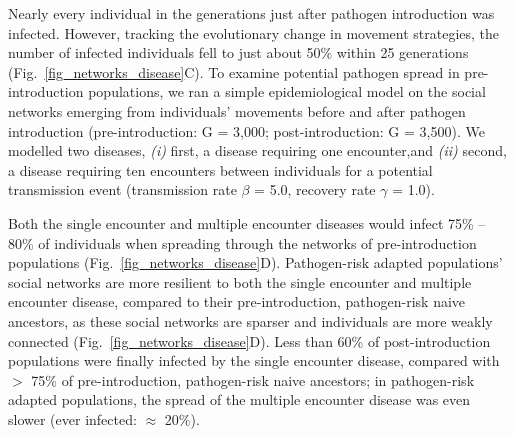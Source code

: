 Nearly every individual in the generations just after pathogen introduction was infected.
However, tracking the evolutionary change in movement strategies, the number of infected individuals fell to just about 50\% within 25 generations (Fig.~\ref{fig_networks_disease}C).
To examine potential pathogen spread in pre-introduction populations, we ran a simple epidemiological model on the social networks emerging from individuals' movements before and after pathogen introduction (pre-introduction: G = 3,000; post-introduction: G = 3,500).
We modelled two diseases, \textit{(i)} first, a disease requiring one encounter,and \textit{(ii)} second, a disease requiring ten encounters between individuals for a potential transmission event (transmission rate $\beta$ = 5.0, recovery rate $\gamma$ = 1.0).

Both the single encounter and multiple encounter diseases would infect 75\% -- 80\% of individuals when spreading through the networks of pre-introduction populations (Fig.~\ref{fig_networks_disease}D).
Pathogen-risk adapted populations' social networks are more resilient to both the single encounter and multiple encounter disease, compared to their pre-introduction, pathogen-risk naive ancestors, as these social networks are sparser and individuals are more weakly connected (Fig.~\ref{fig_networks_disease}D).
Less than 60\% of post-introduction populations were finally infected by the single encounter disease, compared with $>$ 75\% of pre-introduction, pathogen-risk naive ancestors; in pathogen-risk adapted populations, the spread of the multiple encounter disease was even slower (ever infected: $\approx$ 20\%).

